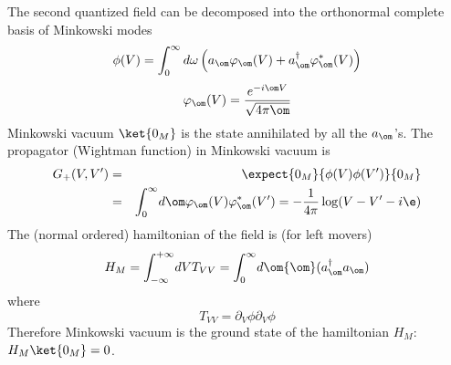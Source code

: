 \documentclass[12pt]{article}
\begin{document}
The second quantized field can be decomposed into the orthonormal
complete basis of
Minkowski modes
\begin{equation} \phi(V) = \int_0^{\infty} d\omega  \left( a_{\om}
\varphi_{\om} (V) + a_{\om}^\dagger \varphi_{\om}^* (V)\right)
\label{threethreeii} \end{equation} \begin{equation} \varphi_{\om} (V) = {
e^{-i\om V} \over \sqrt{4 \pi \om}} \label{threethreeiii}
\end{equation}
Minkowski vacuum $\ket{0_M}$ is the state
 annihilated by all the $a_{\om}$'s. The
propagator (Wightman function)
in Minkowski vacuum is \begin{eqnarray}
G_+(V,V^\prime)
&=&\expect{0_M}{ \phi(V)\phi(V^\prime)}{0_M} \nonumber\\
&=&  \int_0^{\infty} \! d\om \varphi_{\om} (V) \varphi_{\om}^*(V^\prime) =
-{1 \over 4 \pi} \log (V-V^\prime
- i \e) \label{threethreeiv} \end{eqnarray} The (normal ordered)
hamiltonian of the field is
(for left movers) \begin{equation} H_M= \int_{-\infty}^{+\infty} \! dV T_{VV}
=  \int_0^{\infty} \! d\om {\om }  (
a_{\om}^\dagger  a_{\om} ) \label{threethreev} \end{equation}
where
\begin{equation}
 T_{VV} = \partial_V \phi  \partial_V \phi
\label{threetvv}
\end{equation}
 Therefore Minkowski vacuum is the ground state of the hamiltonian $H_M$:
$H_M \ket{0_M} =0$.
\end{document}
